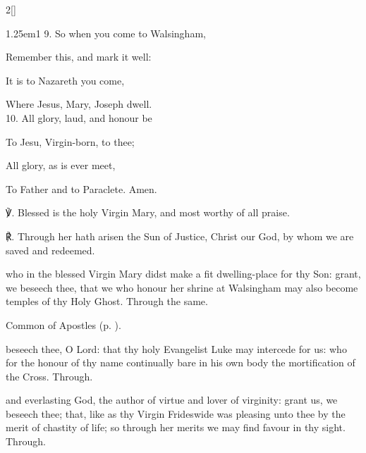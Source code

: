 \begin{paracol}{2}[]
\begin{hangparas}{1.25em}{1}
9. So when you come to Walsingham,\par
Remember this, and mark it well:\par
It is to Nazareth you come,\par
Where Jesus, Mary, Joseph dwell.\\

10. All glory, laud, and honour be\par
To Jesu, Virgin-born, to thee;\par
All glory, as is ever meet,\par
To Father and to Paraclete. Amen.\\
\end{hangparas}

℣. Blessed is the holy Virgin Mary, and most worthy of all praise.

℟. Through her hath arisen the Sun of Justice, Christ our God, by whom we are saved and redeemed.

\end{paracol}


\collect
{} who in the blessed Virgin Mary didst make a fit dwelling-place for thy Son: grant, we beseech thee, that we who honour her shrine at Walsingham may also become temples of thy Holy Ghost. Through the same.



\begin{rubric}
	Common of Apostles (p. \pageref{CommonApostles}).
\end{rubric}

{} beseech thee, O Lord: that thy holy Evangelist Luke may intercede for us: who for the honour of thy name continually bare in his own body the mortification of the Cross. Through.



\memorialCollect
{} and everlasting God, the author of virtue and lover of virginity: grant us, we beseech thee; that, like as thy Virgin Frideswide was pleasing unto thee by the merit of chastity of life; so through her merits we may find favour in thy sight. Through.



